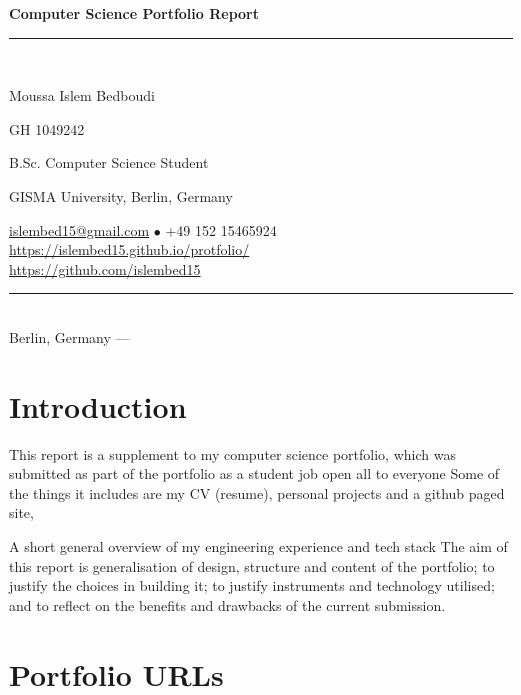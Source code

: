 \documentclass[12pt,a4paper]{article}
\begin{document}
\begin{titlepage}
\centering
\vspace*{2cm}
{\LARGE\bfseries Computer Science Portfolio Report\par}
\vspace{0.5cm}
\rule{0.6\textwidth}{1pt}\\[0.4cm]
{\Large Moussa Islem Bedboudi\par}
\vspace{0.3cm}
{\Large GH 1049242 \par}
{\normalsize B.Sc. Computer Science Student\par}
{\normalsize GISMA University, Berlin, Germany\par}
\vspace{0.3cm}
{\small
\href{mailto:islembed15@gmail.com}{islembed15@gmail.com} \quad $\bullet$ \quad
+49 152 15465924\\[0.2cm]
\href{https://islembed15.github.io/protfolio/}{https://islembed15.github.io/protfolio/}\\[0.2cm]
\href{https://github.com/islembed15}{https://github.com/islembed15}
}
\vspace{0.4cm}
\rule{0.6\textwidth}{1pt}\\
\vfill
{\small Berlin, Germany \quad --- \quad }
\end{titlepage}

\tableofcontents
\newpage

\section{Introduction}

This report is a supplement to my computer science portfolio, which was submitted as part of the
portfolio as a student job open all to everyone
Some of the things it includes are my CV (resume), personal projects and a github paged site,

A short general overview of my engineering experience and tech stack
The aim of this report is generalisation of design, structure and content of the
portfolio; to justify the choices in building it; to justify instruments and
technology utilised; and to reflect on the benefits and drawbacks of
the current submission.

\section{Portfolio URLs}
\end{document}
